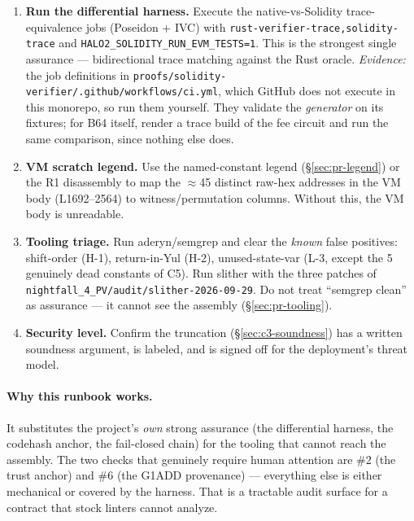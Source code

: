 \begin{enumerate}[leftmargin=1.6em,itemsep=4pt]
  G1MSM output, a VK constant, or a proof point already validated by an
  earlier G1MSM on the same \texttt{success} chain (L3550's
  \texttt{PAIRING\_LHS} is raw $\pi$, validated by the L3486 G1MSM;
  \S\ref{sec:pr-g1add-subgroup}, \S\ref{sec:c4-invariants}). This is the one manual check
  that must not be skipped --- it is what makes the
  subgroup-cancellation attack unreachable.
\item \textbf{Run the differential harness.} Execute the
  native-vs-Solidity trace-equivalence jobs (Poseidon + IVC)
  with \texttt{rust-verifier-trace,solidity-trace} and
  \texttt{HALO2\_\allowbreak{}SOLIDITY\_\allowbreak{}RUN\_\allowbreak{}EVM\_\allowbreak{}TESTS=1}. This is the
  strongest single assurance --- bidirectional trace matching
  against the Rust oracle. \emph{Evidence:} the job definitions in
  \texttt{proofs/\allowbreak{}solidity-verifier/\allowbreak{}.github/\allowbreak{}workflows/\allowbreak{}ci.yml}, which
  GitHub does not execute in this monorepo, so run them yourself. They
  validate the \emph{generator} on its fixtures; for B64 itself,
  render a trace build of the fee circuit and run the same
  comparison, since nothing else does.
\item \textbf{VM scratch legend.} Use the named-constant legend
  (\S\ref{sec:pr-legend}) or the R1 disassembly to map the
  $\approx$45 distinct raw-hex addresses in the VM body (L1692--2564)
  to witness/permutation columns.
  Without this, the VM body is unreadable.
\item \textbf{Tooling triage.} Run aderyn/semgrep and clear the
  \emph{known} false positives: shift-order (H-1),
  return-in-Yul (H-2), unused-state-var (L-3, except the 5 genuinely
  dead constants of C5). Run slither with the three patches of
  \texttt{nightfall\_\allowbreak{}4\_\allowbreak{}PV/\allowbreak{}audit/\allowbreak{}slither-2026-09-29}. Do not treat
  ``semgrep clean'' as assurance --- it cannot see the assembly
  (\S\ref{sec:pr-tooling}).
\item \textbf{Security level.} Confirm the truncation
  (\S\ref{sec:c3-soundness}) has a written soundness argument, is
  labeled, and is signed off for the deployment's threat model.
\end{enumerate}

\paragraph{Why this runbook works.}
It substitutes the project's \emph{own} strong assurance (the
differential harness, the codehash anchor, the fail-closed chain)
for the tooling that cannot reach the assembly. The two checks
that genuinely require human attention are \#2 (the trust
anchor) and \#6 (the G1ADD provenance) --- everything else is
either mechanical or covered by the harness. That is a tractable
audit surface for a contract that stock linters cannot analyze.

